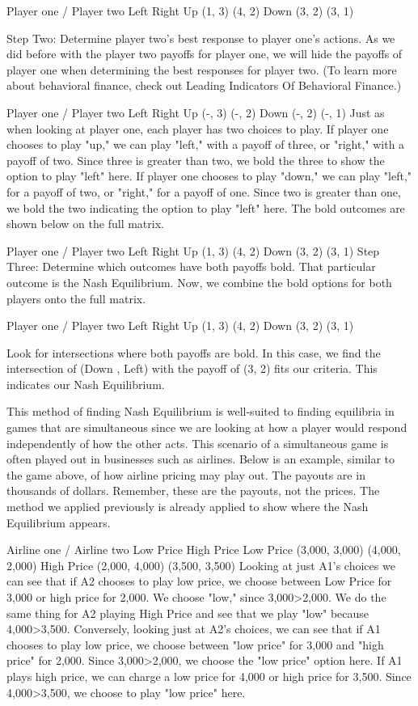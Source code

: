 Player one / Player two	Left	Right
Up	(1, 3)	(4, 2)
Down	(3, 2)	(3, 1)

Step Two: Determine player two's best response to player one's actions.
As we did before with the player two payoffs for player one, we will hide the payoffs of player one when determining the best responses for player two. (To learn more about behavioral finance, check out Leading Indicators Of Behavioral Finance.)

Player one / Player two	Left	Right
Up	(-, 3)	(-, 2)
Down	(-, 2)	(-, 1)
Just as when looking at player one, each player has two choices to play. If player one chooses to play "up," we can play "left," with a payoff of three, or "right," with a payoff of two. Since three is greater than two, we bold the three to show the option to play "left" here. If player one chooses to play "down," we can play "left," for a payoff of two, or "right," for a payoff of one. Since two is greater than one, we bold the two indicating the option to play "left" here. The bold outcomes are shown below on the full matrix.

Player one / Player two	Left	Right
Up	(1, 3)	(4, 2)
Down	(3, 2)	(3, 1)
Step Three: Determine which outcomes have both payoffs bold. That particular outcome is the Nash Equilibrium.
Now, we combine the bold options for both players onto the full matrix.

Player one / Player two	Left	Right
Up	(1, 3)	(4, 2)
Down	(3, 2)	(3, 1)

Look for intersections where both payoffs are bold. In this case, we find the intersection of (Down , Left) with the payoff of (3, 2) fits our criteria. This indicates our Nash Equilibrium.

This method of finding Nash Equilibrium is well-suited to finding equilibria in games that are simultaneous since we are looking at how a player would respond independently of how the other acts. This scenario of a simultaneous game is often played out in businesses such as airlines. Below is an example, similar to the game above, of how airline pricing may play out. The payouts are in thousands of dollars. Remember, these are the payouts, not the prices. The method we applied previously is already applied to show where the Nash Equilibrium appears.

Airline one / Airline two	Low Price	High Price
Low Price	(3,000, 3,000)	(4,000, 2,000)
High Price	(2,000, 4,000)	(3,500, 3,500)
Looking at just A1's choices we can see that if A2 chooses to play low price, we choose between Low Price for 3,000 or high price for 2,000. We choose "low," since 3,000>2,000. We do the same thing for A2 playing High Price and see that we play "low" because 4,000>3,500. Conversely, looking just at A2's choices, we can see that if A1 chooses to play low price, we choose between "low price" for 3,000 and "high price" for 2,000. Since 3,000>2,000, we choose the "low price" option here. If A1 plays high price, we can charge a low price for 4,000 or high price for 3,500. Since 4,000>3,500, we choose to play "low price" here.

